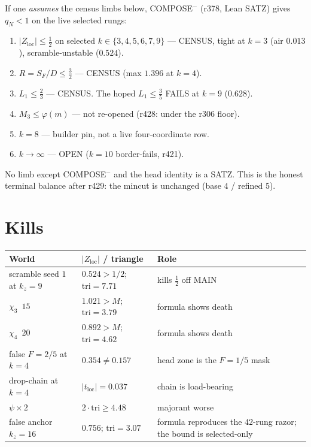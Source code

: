 \documentclass[11pt]{article}
\theoremstyle{remark}
\newcommand{\Zloc}{Z_{\mathrm{loc}}}
\begin{document}
If one \emph{assumes} the census limbs
below, COMPOSE$^{-}$ (r378, Lean SATZ)
gives $q_N<1$ on the live selected rungs:
\begin{enumerate}
\item $\lvert\Zloc\rvert\le\tfrac12$ on
  selected $k\in\{3,4,5,6,7,9\}$
  --- CENSUS, tight at $k=3$ (air $0.013$),
  scramble-unstable ($0.524$).
\item $R=S_F/D\le\tfrac32$ --- CENSUS
  (max $1.396$ at $k=4$).
\item $L_1\le\tfrac23$ --- CENSUS.
  The hoped $L_1\le\tfrac35$ FAILS at
  $k=9$ ($0.628$).
\item $M_3\le\varphi(m)$ --- not re-opened
  (r428: under the r306 floor).
\item $k=8$ --- builder pin, not a live
  four-coordinate row.
\item $k\to\infty$ --- OPEN
  ($k=10$ border-fails, r421).
\end{enumerate}
No limb except COMPOSE$^{-}$ and the
head identity is a SATZ.
This is the honest terminal balance after
r429: the mincut is unchanged
(base $4$ / refined $5$).

\section{Kills}\label{sec:kills}

\begin{center}
\small
\begin{tabular}{@{}lll@{}}
\toprule
World & $\lvert\Zloc\rvert$ / triangle & Role \\
\midrule
scramble seed $1$ at $k_z=9$ &
  $0.524>1/2$; $\mathrm{tri}=7.71$ &
  kills $\tfrac12$ off MAIN \\
$\chi_3$~$15$ & $1.021>M$; $\mathrm{tri}=3.79$ &
  formula shows death \\
$\chi_4$~$20$ & $0.892>M$; $\mathrm{tri}=4.62$ &
  formula shows death \\
false $F=2/5$ at $k=4$ & $0.354\neq 0.157$ &
  head zone is the $F=1/5$ mask \\
drop-chain at $k=4$ & $\lvert t_{\mathrm{loc}}\rvert=0.037$ &
  chain is load-bearing \\
$\psi\times 2$ & $2\cdot\mathrm{tri}\ge 4.48$ &
  majorant worse \\
false anchor $k_z=16$ & $0.756$; $\mathrm{tri}=3.07$ &
  formula reproduces the $42$-rung razor;
  the bound is selected-only \\
\bottomrule
\end{tabular}
\end{center}
\end{document}
